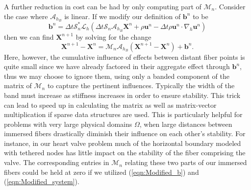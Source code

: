 \documentclass[preprint,12pt]{elsarticle}
\begin{document}
A further reduction in cost can be had by only computing part of $\mathcal{M}_n$. Consider the case where $\mathcal{A}_{h_B}$ is linear. If we modify our definition of $\mathbf{b}^n$ to be
\begin{equation}
\mathbf{b}^n=\Delta t\mathcal{S}^*_n\mathcal{L}_h(\Delta t\mathcal{S}_n\mathcal{A}_{h_B}\mathbf{X}^n + \rho\mathbf{u}^n - \Delta t\rho\mathbf{u}^n \cdot \nabla_h \mathbf{u}^n)
\label{eqn:Modified_b}
\end{equation}
then we can find $\mathbf{X}^{n+1}$ by solving for the change
\begin{equation}
\mathbf{X}^{n+1}-\mathbf{X}^n = \mathcal{M}_n \mathcal{A}_{h_B} (\mathbf{X}^{n+1}-\mathbf{X}^n) + \mathbf{b}^n.
\label{eqn:Modified_system}
\end{equation}
Here, however, the cumulative influence of effects between distant fiber points is quite small since we have already factored in their aggregate effect through $\mathbf{b}^n$, thus we may choose to ignore them, using only a banded component of the matrix of $\mathcal{M}_n$ to capture the pertinent influences. Typically the width of the band must increase as stiffness increases in order to ensure stability. This trick can lead to speed up in calculating the matrix as well as matrix-vector multiplication if sparse data structures are used. This is particularly helpful for problems with very large physical domains $\Omega$, when large distances between immersed fibers drastically diminish their influence on each other's stability. For instance, in our heart valve problem much of the horizontal boundary modeled with tethered nodes has little impact on the stability of the fiber comprising the valve. The corresponding entries in $\mathcal{M}_n$ relating these two parts of our immersed fibers could be held at zero if we utilized (\ref{eqn:Modified_b}) and (\ref{eqn:Modified_system}).
\end{document}
